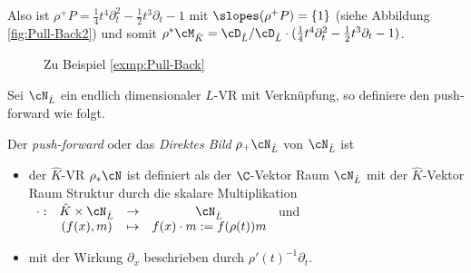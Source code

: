 \begin{exmp}
Also ist $\rho^+P= \frac{1}{4}t^4\partial_t^2 -\frac{1}{2}t^3\partial_t-1$ mit
$ \slopes(\rho^+P)=\{1\} $ (siehe Abbildung \ref{fig:Pull-Back2}) und somit
$\rho^*\cM_{\hat K}=\cD_{\hat L}/\cD_{\hat L}
\cdot(\frac{1}{4}t^4\partial_t^2-\frac{1}{2}t^3\partial_t-1)$.
\begin{figure}[H]
\label{fig:Pull-Back}
\caption{Zu Beispiel \ref{exmp:Pull-Back}}
\begin{center}
\end{center}
\end{figure}
\end{exmp}

Sei $\cN_{\hat L}$ ein endlich dimensionaler $\hat L$-VR mit Verknüpfung, so
definiere den push-forward wie folgt.
\begin{defn}
\cite[1.a]{sabbah_Fourier-local}
Der \emph{push-forward} oder das \emph{Direktes Bild} $\rho_+\cN_{\hat L}$ von
$\cN_{\hat L}$ ist
\begin{itemize}
\item der $\hat K$-VR $\rho_*\cN$ ist definiert als der $\C$-Vektor Raum
$\cN_{\hat L}$ mit der $\hat K$-Vektor Raum Struktur durch
die skalare Multiplikation
$\begin{array}[t]{cccc}
\cdot: & \hat{K}\times\cN_{\hat{L}} & \rightarrow & \cN_{\hat{L}}\\
 & (f(x),m) & \mapsto & f(x)\cdot m:=f(\rho(t))m
\end{array}$ und
\item mit der Wirkung $\partial_x$ beschrieben durch
$\rho'(t)^{-1}\partial_t$.
\end{itemize}
\end{defn}

